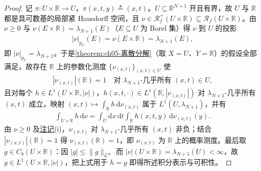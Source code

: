 \documentclass[../main.tex]{subfiles}
\begin{document}
\begin{proof}
记 $\pi:U\times\mathbb{R}\to U$，$\pi(x,t,y)\triangleq(x,t)$。$U\subseteq\mathbb{R}^{N+1}$ 开且有界，故 $U$ 与 $\mathbb{R}$ 都是具可数基的局部紧 Hausdorff 空间，且 $\nu\in\mathscr{R}^+_f(U\times\mathbb{R})\subseteq\mathscr{R}_f(U\times\mathbb{R})$。由 $\nu\geqslant0$ 与 $\nu(E\times\mathbb{R})=\lambda_{N+1}(E)$（$E\subseteq U$ 为 Borel 集）得 $\nu$ 到 $U$ 的投影
\begin{align*}
|\nu|_{p_U}(E)=\nu(E\times\mathbb{R})=\lambda_{N+1}(E),
\end{align*}
即 $|\nu|_{p_U}=\lambda_{N+1}$。于是\cref{theorem:ch05-离散分解}（取 $X=U$、$Y=\mathbb{R}$）的假设全部满足，故存在 $\mathbb{R}$ 上的参数化测度 $\{\nu_{(x,t)}\}_{(x,t)\in U}$ 使
\begin{align*}
|\nu_{(x,t)}|(\mathbb{R})=1\quad\text{对 }\lambda_{N+1}\text{-几乎所有 }(x,t)\in U,
\end{align*}
且对每个 $h\in L^1(U\times\mathbb{R},|\nu|)$，$h(x,t,\cdot)\in L^1(\mathbb{R},|\nu_{(x,t)}|)$ 对 $\lambda_{N+1}$-几乎所有 $(x,t)$ 成立，映射 $(x,t)\mapsto\int_{\mathbb{R}}h\,\mathrm{d}\nu_{(x,t)}$ 属于 $L^1(U,\lambda_{N+1})$，并有
\begin{align*}
\int_{U\times\mathbb{R}}h\,\mathrm{d}\nu
=\int_U\mathrm{d}x\,\mathrm{d}t\int_{\mathbb{R}}h(x,t,y)\,\mathrm{d}\nu_{(x,t)}(y).
\end{align*}
由 $\nu\geqslant0$ 及\hyperref[remark:ch05-离散分解注]{注记}(i)，$\nu_{(x,t)}$ 对 $\lambda_{N+1}$-几乎所有 $(x,t)$ 非负；结合 $|\nu_{(x,t)}|(\mathbb{R})=1$ 得 $\nu_{(x,t)}(\mathbb{R})=1$，即 $\nu_{(x,t)}$ 为 $\mathbb{R}$ 上的概率测度。最后取 $g\in C_b(U\times\mathbb{R})$：因 $|g|\leqslant\|g\|_{L^\infty}$ 而 $|\nu|(U\times\mathbb{R})=\lambda_{N+1}(U)<\infty$，故 $g\in L^1(U\times\mathbb{R},|\nu|)$，把上式用于 $h=g$ 即得所述积分表示与可积性。
\end{proof}
\end{document}
